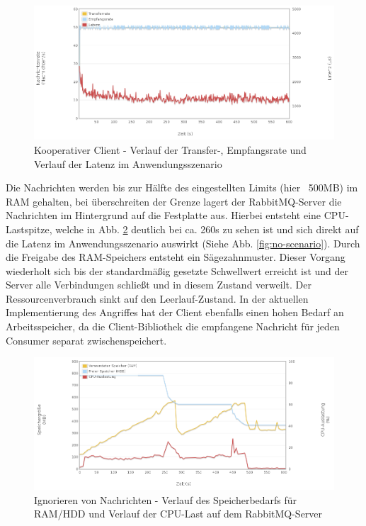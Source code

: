 \documentclass[	a4paper,
			11pt,
			titlepage,
			oneside,
			fleqn,
			listof=totoc,
			parskip,
			numbers=noenddot]{scrartcl}
\begin{document}
		\begin{figure}[!htb]
			\centering
			\includegraphics[width=\textwidth]{img/ack/ack_scenario.png}
			\caption{Kooperativer Client - Verlauf der Transfer-, Empfangsrate und Verlauf der Latenz im Anwendungsszenario}
			\label{fig:ack-scenario}
		\end{figure}
	
	
	\clearpage
		{%
		  \newline
		  \newline
		  \newline
		}{%
		 Die Nachrichten werden bis zur Hälfte des eingestellten Limits (hier ~500MB) im RAM gehalten, bei überschreiten der Grenze lagert der RabbitMQ-Server die Nachrichten im Hintergrund auf die Festplatte aus.
		 Hierbei entsteht eine CPU-Lastspitze, welche in Abb. \ref{fig:no-server1} deutlich bei ca. 260s zu sehen ist und sich direkt auf die Latenz im Anwendungsszenario auswirkt (Siehe Abb. \ref{fig:no-scenario}). Durch die Freigabe des RAM-Speichers entsteht ein Sägezahnmuster. Dieser Vorgang wiederholt sich bis der standardmäßig gesetzte Schwellwert erreicht ist und der Server alle Verbindungen schließt und in diesem Zustand verweilt. Der Ressourcenverbrauch sinkt auf den Leerlauf-Zustand.
		}{%
		 In der aktuellen Implementierung des Angriffes hat der Client ebenfalls einen hohen Bedarf an Arbeitsspeicher, da die Client-Bibliothek die empfangene Nachricht für jeden Consumer
		 separat zwischenspeichert.
		}
		
		\begin{figure}[!htb]
			\centering
			\includegraphics[width=\textwidth]{img/no/no_server1.png}
			\caption{Ignorieren von Nachrichten - Verlauf des Speicherbedarfs für RAM/HDD und Verlauf der CPU-Last auf dem RabbitMQ-Server}
			\label{fig:no-server1}
		\end{figure}
		
\end{document}
